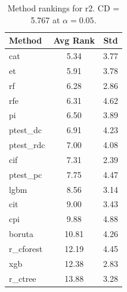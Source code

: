 \begin{table}[h]
\centering
\caption{Method rankings for r2. CD = 5.767 at $\alpha=0.05$.}
\label{tab:ranks_r2}
\begin{tabular}{lcc}
\toprule
Method & Avg Rank & Std \\
\midrule
cat & 5.34 & 3.77 \\
et & 5.91 & 3.78 \\
rf & 6.28 & 2.86 \\
rfe & 6.31 & 4.62 \\
pi & 6.50 & 3.89 \\
ptest_dc & 6.91 & 4.23 \\
ptest_rdc & 7.00 & 4.08 \\
cif & 7.31 & 2.39 \\
ptest_pc & 7.75 & 4.47 \\
lgbm & 8.56 & 3.14 \\
cit & 9.00 & 3.43 \\
cpi & 9.88 & 4.88 \\
boruta & 10.81 & 4.26 \\
r_cforest & 12.19 & 4.45 \\
xgb & 12.38 & 2.83 \\
r_ctree & 13.88 & 3.28 \\
\bottomrule
\end{tabular}
\end{table}